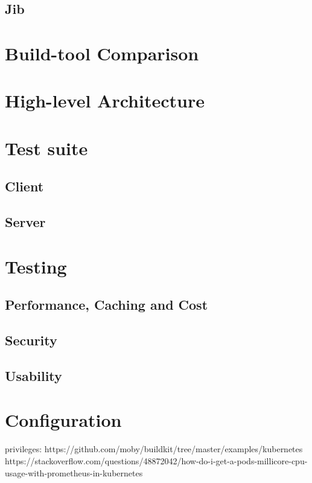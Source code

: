 \subsection{Jib}
\section{Build-tool Comparison}


\section{High-level Architecture}

\section{Test suite}
\subsection{Client}
\subsection{Server}

\section{Testing}
\subsection{Performance, Caching and Cost}
\subsection{Security}
\subsection{Usability}

\section{Configuration}
privileges: https://github.com/moby/buildkit/tree/master/examples/kubernetes
https://stackoverflow.com/questions/48872042/how-do-i-get-a-pods-millicore-cpu-usage-with-prometheus-in-kubernetes